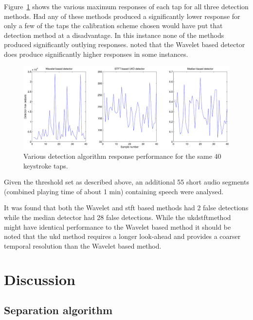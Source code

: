 Figure~\ref{fig:maxes.pdf} shows the various maximum responses of each tap for all three detection methods. Had any of these methods produced a significantly lower response for only a few of the taps the calibration scheme chosen would have put that detection method at a disadvantage. In this instance none of the methods produced significantly outlying responses. \DIFdelbegin {}\DIFdelend \DIFaddbegin {}\DIFaddend noted that the Wavelet based detector does produce significantly higher responses in some instances.

\begin{figure} %
\centering
\includegraphics[width=120mm]{maxes.pdf}
\caption{Various detection algorithm response performance for the same 40 keystroke taps.}
\label{fig:maxes.pdf}
\end{figure}

Given the threshold set as described above, an additional 55 short audio segments (combined playing time of about 1 min) containing speech were analysed.

It was found that both the Wavelet and \DIFdelbegin {}\DIFdelend \DIFaddbegin \gls{stft} \DIFaddend based methods had 2 false detections while the median detector had 28 false detections. While the \DIFdelbegin {}\DIFdelend \DIFaddbegin \gls{ukd}\gls{stft}\DIFadd{, }\DIFaddend method might have identical performance to the Wavelet based method it should be noted that the \DIFdelbegin {}\DIFdelend \DIFaddbegin \gls{ukd} \DIFaddend method requires a longer look-ahead and provides a coarser temporal resolution than the Wavelet based method.

\section{Discussion}\label{sec:WPdiscussion}
\subsection{Separation algorithm}

